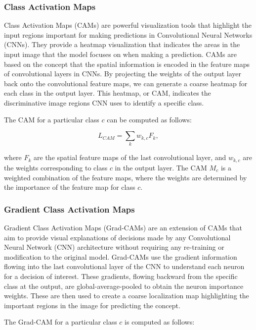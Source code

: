 \subsubsection{Class Activation Maps}

Class Activation Maps (CAMs) are powerful visualization tools that highlight the input regions important for making predictions in Convolutional Neural Networks (CNNs). They provide a heatmap visualization that indicates the areas in the input image that the model focuses on when making a prediction. CAMs are based on the concept that the spatial information is encoded in the feature maps of convolutional layers in CNNs. By projecting the weights of the output layer back onto the convolutional feature maps, we can generate a coarse heatmap for each class in the output layer. This heatmap, or CAM, indicates the discriminative image regions CNN uses to identify a specific class.

The CAM for a particular class $c$ can be computed as follows:

\begin{equation}
    L_{CAM} = \sum_k w_{k,c} F_k,
\end{equation}

where $F_k$ are the spatial feature maps of the last convolutional layer, and $w_{k,c}$ are the weights corresponding to class $c$ in the output layer. The CAM $M_c$ is a weighted combination of the feature maps, where the weights are determined by the importance of the feature map for class $c$.

\subsubsection{Gradient Class Activation Maps}

Gradient Class Activation Maps (Grad-CAMs) are an extension of CAMs that aim to provide visual explanations of decisions made by any Convolutional Neural Network (CNN) architecture without requiring any re-training or modification to the original model. Grad-CAMs use the gradient information flowing into the last convolutional layer of the CNN to understand each neuron for a decision of interest. These gradients, flowing backward from the specific class at the output, are global-average-pooled to obtain the neuron importance weights. These are then used to create a coarse localization map highlighting the important regions in the image for predicting the concept.

The Grad-CAM for a particular class $c$ is computed as follows:

